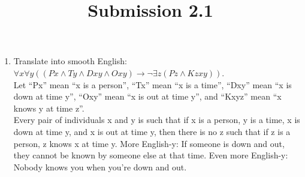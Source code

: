\documentclass{article}
\title{Submission 2.1}
\date{}
\begin{document}
\maketitle

\begin{enumerate}
    \item Translate into smooth English: $\forall x\forall y((Px \land Ty \land Dxy \land Oxy) \to \neg \exists z(Pz \land Kzxy))$.\\
          Let “Px” mean “x is a person”, “Tx” mean “x is a time”, “Dxy” mean “x is down at time y”, “Oxy” mean “x is out at time y”, and “Kxyz” mean “x knows y at time z”.\\
          Every pair of individuals x and y is such that if x is a person, y is a time, x is down at time y, and x is out at time y, then there is no z such that if z is a person, z knows x at time y. More English-y: If someone is down and out, they cannot be known by someone else at that time. Even more English-y: Nobody knows you when you're down and out.
\end{enumerate}
\end{document}
